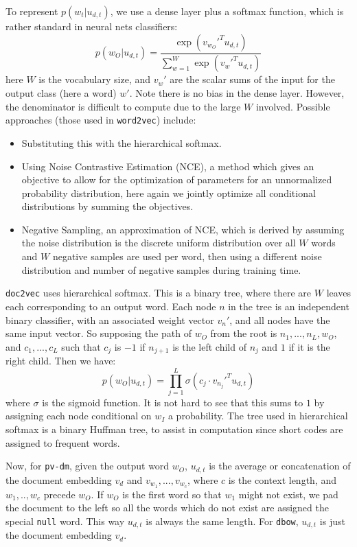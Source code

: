 \documentclass{article}
\begin{document}
To represent $p(w_t|u_{d,t})$, we use a dense layer plus a softmax function, which is rather standard in neural nets classifiers:
    \[p(w_O|u_{d,t})=\frac{\exp(v_{w_O}'^T u_{d,t})}{\sum_{w=1}^W \exp(v_w'^T u_{d,t})}\]
here $W$ is the vocabulary size, and $v_w'$ are the scalar sums of the input for the output class (here a word) $w'$. Note there is no bias in the dense layer. However, the denominator is difficult to compute due to the large $W$ involved. Possible approaches (those used in \texttt{word2vec}) include:
\begin{itemize}
    \item Substituting this with the hierarchical softmax.
    \item Using Noise Contrastive Estimation (NCE), a method which gives an objective to allow for the optimization of parameters for an unnormalized probability distribution, here again we jointly optimize all conditional distributions by summing the objectives.
    \item Negative Sampling, an approximation of NCE, which is derived by assuming the noise distribution is the discrete uniform distribution over all $W$ words and $W$ negative samples are used per word, then using a different noise distribution and number of negative samples during training time.
\end{itemize}

\texttt{doc2vec} uses hierarchical softmax. This is a binary tree, where there are $W$ leaves each corresponding to an output word. Each node $n$ in the tree is an independent binary classifier, with an associated weight vector $v_n'$, and all nodes have the same input vector. So supposing the path of $w_O$ from the root is $n_1,...,n_L,w_O$, and $c_1,...,c_L$ such that $c_j$ is $-1$ if $n_{j+1}$ is the left child of ${n_j}$ and $1$ if it is the right child. Then we have:
    \[p(w_O|u_{d,t})=\prod_{j=1}^{L}\sigma(c_j\cdot v_{n_j}'^T u_{d,t})\]
where $\sigma$ is the sigmoid function. It is not hard to see that this sums to $1$ by assigning each node conditional on $w_I$ a probability. The tree used in hierarchical softmax is a binary Huffman tree, to assist in computation since short codes are assigned to frequent words.

Now, for \texttt{pv-dm}, given the output word $w_O$, $u_{d,t}$ is the average or concatenation of the document embedding $v_d$ and $v_{w_1},...,v_{w_c}$, where $c$ is the context length, and $w_1,..,w_c$ precede $w_O$. If $w_O$ is the first word so that $w_1$ might not exist, we pad the document to the left so all the words which do not exist are assigned the special \texttt{null} word. This way $u_{d,t}$ is always the same length. For \texttt{dbow}, $u_{d,t}$ is just the document embedding $v_d$.
\end{document}
